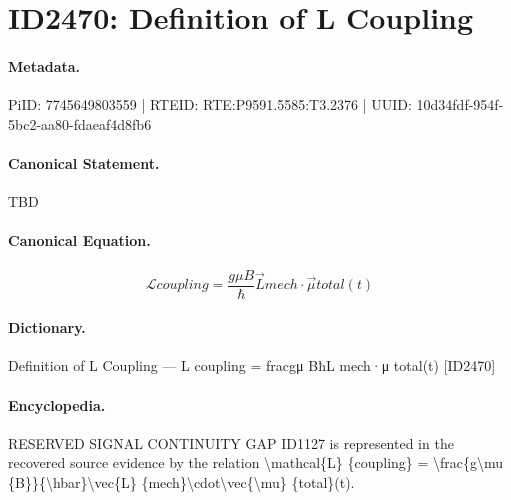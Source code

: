 \section*{ID2470: Definition of L Coupling}
\paragraph{Metadata.}
PiID: 7745649803559 | RTEID: RTE:P9591.5585:T3.2376 | UUID: 10d34fdf-954f-5bc2-aa80-fdaeaf4d8fb6

\paragraph{Canonical Statement.}
TBD

\paragraph{Canonical Equation.}
\[
\mathcal{L} {coupling} = \frac{g\mu {B}}{\hbar}\vec{L} {mech}\cdot\vec{\mu} {total}(t)
\]

\paragraph{Dictionary.}
Definition of L Coupling — L coupling = fracgμ BħL mech·μ total(t) [ID2470]

\paragraph{Encyclopedia.}
RESERVED SIGNAL CONTINUITY GAP ID1127 is represented in the recovered source evidence by the relation \textbackslash{}mathcal\{L\} \{coupling\} = \textbackslash{}frac\{g\textbackslash{}mu \{B\}\}\{\textbackslash{}hbar\}\textbackslash{}vec\{L\} \{mech\}\textbackslash{}cdot\textbackslash{}vec\{\textbackslash{}mu\} \{total\}(t).
